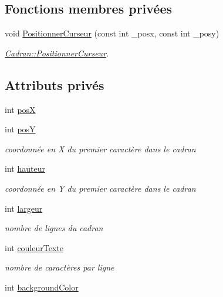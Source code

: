 \subsection*{Fonctions membres privées}
\begin{DoxyCompactItemize}
\item 
void \hyperlink{class_cadran_aad5b68b6c93bfba09b0903eb7faacc9b}{Positionner\+Curseur} (const int \+\_\+posx, const int \+\_\+posy)
\begin{DoxyCompactList}\small\item\em \hyperlink{class_cadran_aad5b68b6c93bfba09b0903eb7faacc9b}{Cadran\+::\+Positionner\+Curseur}. \end{DoxyCompactList}\end{DoxyCompactItemize}
\subsection*{Attributs privés}
\begin{DoxyCompactItemize}
\item 
int \hyperlink{class_cadran_a4b753893bf4f7bb4b61018544ddb2450}{posX}
\item 
int \hyperlink{class_cadran_a9fe9e082e2421e00d044598765adcdeb}{posY}
\begin{DoxyCompactList}\small\item\em coordonnée en X du premier caractère dans le cadran \end{DoxyCompactList}\item 
int \hyperlink{class_cadran_a18a3e6147ef0d98e8f556b7a590c753e}{hauteur}
\begin{DoxyCompactList}\small\item\em coordonnée en Y du premier caractère dans le cadran \end{DoxyCompactList}\item 
int \hyperlink{class_cadran_a6c930bf327a38424afe4cb0ce75c0650}{largeur}
\begin{DoxyCompactList}\small\item\em nombre de lignes du cadran \end{DoxyCompactList}\item 
int \hyperlink{class_cadran_a2070501e183ca1fb9c495a6ba878a97e}{couleur\+Texte}
\begin{DoxyCompactList}\small\item\em nombre de caractères par ligne \end{DoxyCompactList}\item 
int \hyperlink{class_cadran_a8c52e6d7e12ce74694a494c3ad68611e}{background\+Color}
\end{DoxyCompactItemize}


